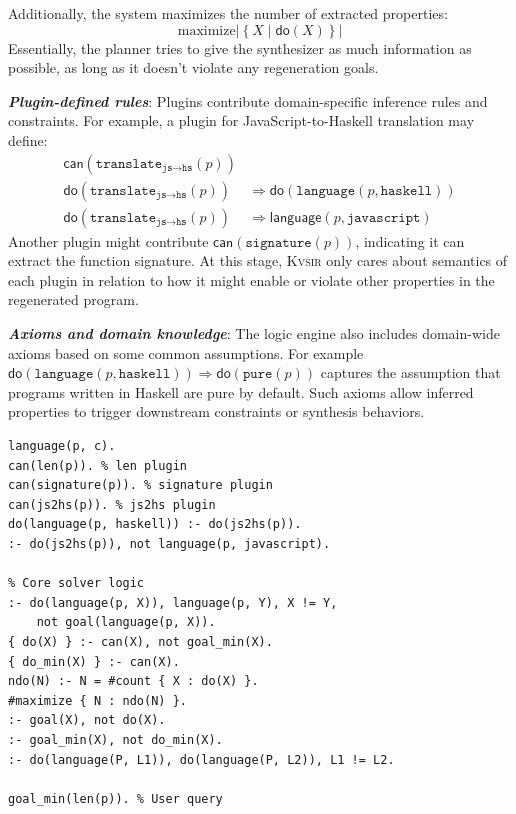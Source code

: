 \documentclass[noacm,sigplan]{acmart}
\def\eg{{\em e.g.}, }
\newcommand{\sys}{{\scshape Kv{\textalpha}sir}\xspace}
\newcommand{\heading}[1]{\vspace{2pt}\noindent\textbf{\emph{#1}}:\enspace}
\newcommand{\ttt}[1]{\texttt{#1}\xspace}
\begin{document}
Additionally, the system maximizes the number of extracted properties:
\[
\text{maximize} \left|\left\{ X \mid \mathsf{do}(X) \right\}\right|
\]
Essentially, the planner tries to give the synthesizer as much information
as possible, as long as it doesn't violate any regeneration goals.

\heading{Plugin-defined rules}
Plugins contribute domain-specific inference rules and constraints. For example, a plugin for JavaScript-to-Haskell translation may define:
\begin{align*}
\mathsf{can}(\texttt{translate}_{\texttt{js} \rightarrow \texttt{hs}}(p)) & \\
\mathsf{do}(\texttt{translate}_{\texttt{js} \rightarrow \texttt{hs}}(p)) &\Rightarrow \mathsf{do}(\texttt{language}(p, \texttt{haskell})) \\
\mathsf{do}(\texttt{translate}_{\texttt{js} \rightarrow \texttt{hs}}(p)) &\Rightarrow \mathsf{language}(p, \texttt{javascript})
\end{align*}
Another plugin might contribute $\mathsf{can}(\texttt{signature}(p))$, indicating it can extract the function signature. At this stage, \sys only cares about semantics of each plugin in relation to how it might enable or violate 
other properties in the regenerated program.

\heading{Axioms and domain knowledge}
The logic engine also includes domain-wide axioms based on some common assumptions.
For example
$\mathsf{do}(\texttt{language}(p, \texttt{haskell})) \Rightarrow \mathsf{do}(\texttt{pure}(p))$
captures the assumption that programs written in Haskell are pure by default.
Such axioms allow inferred properties to trigger downstream constraints or synthesis behaviors.

\begin{listing}
  \begin{verbatim}
language(p, c).
can(len(p)). % len plugin
can(signature(p)). % signature plugin
can(js2hs(p)). % js2hs plugin
do(language(p, haskell)) :- do(js2hs(p)).
:- do(js2hs(p)), not language(p, javascript).

% Core solver logic
:- do(language(p, X)), language(p, Y), X != Y,
    not goal(language(p, X)).
{ do(X) } :- can(X), not goal_min(X).
{ do_min(X) } :- can(X).
ndo(N) :- N = #count { X : do(X) }.
#maximize { N : ndo(N) }.
:- goal(X), not do(X).
:- goal_min(X), not do_min(X).
:- do(language(P, L1)), do(language(P, L2)), L1 != L2.

goal_min(len(p)). % User query
\end{verbatim}
  \caption{\textbf{Example \sys logic program.}
  This is a lightly simplified version of the logic program that produces the plan for the idiomatization task~(\cref{sec:example}). 
  The program contains facts coming from (1) the input program (written in C),
  (2) three plugins (\ttt{len}, \ttt{signature}, and \ttt{javascript2haskell}),
  (3) axioms from the logic engine (\eg a program can have one language, an analysis will be applied only if possible, all goals must be satisfied), and
  (4) the user query (the user wants to minimize the length of the program).
  }
  \label{lst:logic-example}
\end{listing}
\end{document}
